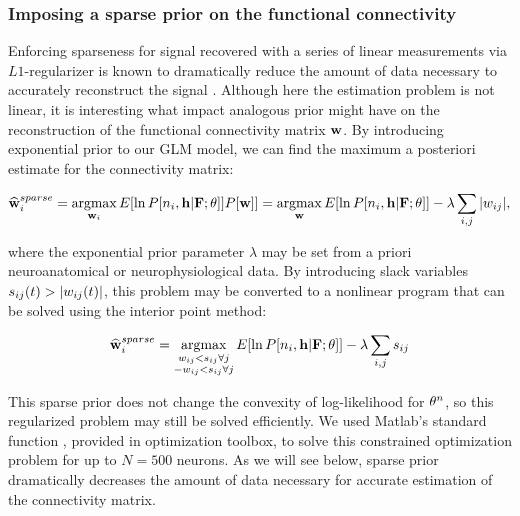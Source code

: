\subsubsection{Imposing a sparse prior on the functional connectivity}

Enforcing sparseness for signal recovered with a series of linear measurements via $L1$-regularizer is known to dramatically reduce the amount of data necessary to accurately reconstruct the signal \cite{Candes2005, DE03, Mishchenko2009}. Although here the estimation problem is not linear, it is interesting what impact analogous prior might have on the reconstruction of the functional connectivity matrix $\mathbf{w}$. By introducing exponential prior to our GLM model\cite{Stevenson2009}, we can find the maximum a posteriori estimate for the connectivity matrix:

\begin{equation}\label{eqn:likelihoodsparseGLM}
\widehat{\mathbf{w}}_i^{sparse} = \operatorname*{argmax}_{\mathbf{w}_i} E[\ln P[n_i, \mathbf{h} |{\bf F}; \mathbf{\theta}]] P[\mathbf{w}]]= \operatorname*{argmax}_{\mathbf{w}} E[\ln P[n_i, \mathbf{h} |{\bf F}; \mathbf{\theta}]] - \lambda \sum_{i,j}|w_{ij}|,
\end{equation}

\noindent where the exponential prior parameter $\lambda$ may be set from a priori neuroanatomical or neurophysiological data.  By introducing slack variables $s_{ij}(t)>|w_{ij}(t)|$, this problem may be converted to a nonlinear program that can be solved using the interior point method:

\begin{equation} \label{eqn:conconvexopt}
	\widehat{\mathbf{w}}_i^{sparse} = \operatorname*{argmax}_{\substack{w_{ij}<s_{ij} \forall j \\ -w_{ij}<s_{ij} \forall j}}   E[\ln P[n_i, \mathbf{h} |{\bf F}; \mathbf{\theta}]] - \lambda \sum_{i,j} s_{ij}
\end{equation}

\noindent This sparse prior does not change the convexity of log-likelihood for $\mathbf{\theta}^n$, so this regularized problem may still be solved efficiently.  We used Matlab's standard function , provided in optimization toolbox, to solve this constrained optimization problem for up to $N=500$ neurons. As we will see below, sparse prior dramatically decreases the amount of data necessary for accurate estimation of the connectivity matrix.


